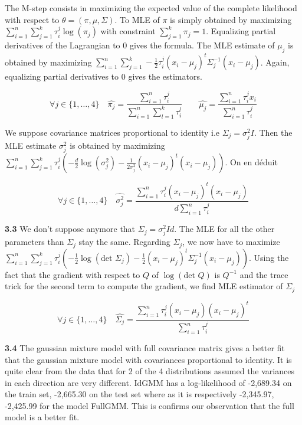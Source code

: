 \documentclass[a4paper, 11pt]{article}
\begin{document}
The M-step consists in maximizing the expected value of the complete likelihood with respect to $\theta=(\pi, \mu,
\Sigma)$. To MLE of $\pi$ is simply obtained by maximizing $\sum_{i=1}^n \sum_{j=1}^k \tau_i^j \log(\pi_j)$ with
constraint $\sum_{j=1}^k \pi_j = 1$. Equalizing partial derivatives of the Lagrangian to 0 gives the formula.
The MLE estimate of $\mu_j$ is obtained by maximizing $\sum_{i=1}^n \sum_{j=1}^k -\frac{1}{2} \tau_i^j (x_i-\mu_j)^t 
\Sigma_j^{-1} (x_i-\mu_j)$. Again, equalizing partial derivatives to 0 gives the estimators.

\begin{equation}
 \boxed{\forall j \in \{1, \dots, 4\} \quad \widehat{\pi_j} = \frac{\sum_{i=1}^n \tau_i^j}{\sum_{i=1}^n \sum_{l=1}^k \tau_i^l}  \qquad \widehat{\mu_j} =
 \frac{\sum_{i=1}^n \tau_i^j x_i}{\sum_{i=1}^n \tau_i^j}}
\end{equation}

We suppose covariance matrices proportional to identity i.e $\Sigma_j = \sigma_j^2 I$. Then the MLE estimate $\sigma_j^2$ is
obtained by maximizing $\sum_{i=1}^n \sum_{j=1}^k \tau_i^j (-\frac{d}{2} \log(\sigma_j^2) - \frac{1}{2\sigma_j^2}(x_i -
\mu_j)^t (x_i - \mu_j))$. On en déduit 

\begin{equation}
 \boxed{ \forall j \in \{1, \dots, 4\} \quad \widehat{\sigma_j^2} = \frac{\sum_{i=1}^n \tau_i^j (x_i - \mu_j)^t (x_i -
 \mu_j)}{d\sum_{i=1}^n \tau_i^j}}
\end{equation}

\textbf{3.3} We don't suppose anymore that $\Sigma_j = \sigma_j^2 Id$. The MLE for all the other parameters than $\Sigma_j$ stay
the same. Regarding $\Sigma_j$, we now have to maximize  $\sum_{i=1}^n \sum_{j=1}^k \tau_i^j (-\frac{1}{2}
\log(\text{det }\Sigma_j) - \frac{1}{2}(x_i - \mu_j)^t \Sigma_j^{-1} (x_i - \mu_j))$. Using the fact that the gradient
with respect to $Q$ of $\log(\text{det } Q)$ is $Q^{-1}$ and the trace trick for the second term to compute the
gradient, we find MLE estimator of $\Sigma_j$

\begin{equation}
 \boxed{ \forall j \in \{1, \dots, 4\} \quad \widehat{\Sigma_j} = \frac{\sum_{i=1}^n \tau_i^j (x_i - \mu_j)(x_i -
 \mu_j)^t}{\sum_{i=1}^n \tau_i^j}}
\end{equation}

\textbf{3.4} The gaussian mixture model with full covariance matrix gives a better fit that the gaussian mixture
model with covariances proportional to identity. It is quite clear from the data that for 2 of the 4 distributions
assumed the variances in each direction are very different. IdGMM has a log-likelihood of -2,689.34 on the train set,
-2,665.30 on the test set where as it is respectively -2,345.97, -2,425.99 for the model FullGMM. This is confirms 
our observation that the full model is a better fit.
\end{document}
